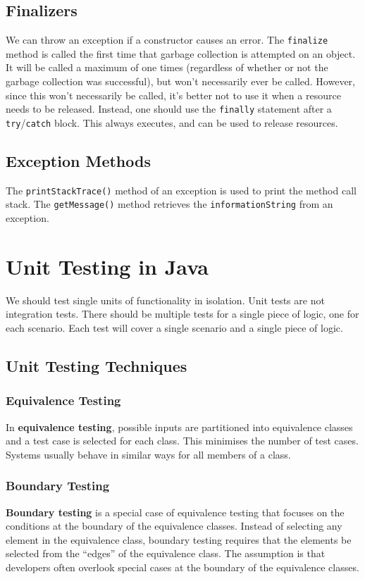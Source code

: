 \documentclass[a4paper,11pt]{article}
\begin{document}
\subsection{Finalizers}
We can throw an exception if a constructor causes an error.
The \verb|finalize| method is called the first time that garbage collection is attempted on an object. 
It will be called a maximum of one times (regardless of whether or not the garbage collection was successful), but
won't necessarily ever be called.
However, since this won't necessarily be called, it's better not to use it when a resource needs to be released. 
Instead, one should use the \verb|finally| statement after a \verb|try|/\verb|catch| block. 
This always executes, and can be used to release resources.

\subsection{Exception Methods}
The \verb|printStackTrace()| method of an exception is used to print the method call stack. 
The \verb|getMessage()| method retrieves the \verb|informationString| from an exception.

\section{Unit Testing in Java}
We should test single units of functionality in isolation. 
Unit tests are not integration tests. 
There should be multiple tests for a single piece of logic, one for each scenario. 
Each test will cover a single scenario and a single piece of logic.

\subsection{Unit Testing Techniques}
\subsubsection{Equivalence Testing}
In \textbf{equivalence testing}, possible inputs are partitioned into equivalence classes and a test case is selected for 
each class. 
This minimises the number of test cases. 
Systems usually behave in similar ways for all members of a class.

\subsubsection{Boundary Testing}
\textbf{Boundary testing} is a special case of equivalence testing that focuses on the conditions at the boundary of the 
equivalence classes. 
Instead of selecting any element in the equivalence class, boundary testing requires that the elements be selected from the 
``edges'' of the equivalence class. 
The assumption is that developers often overlook special cases at the boundary of the equivalence classes. 
\end{document}
